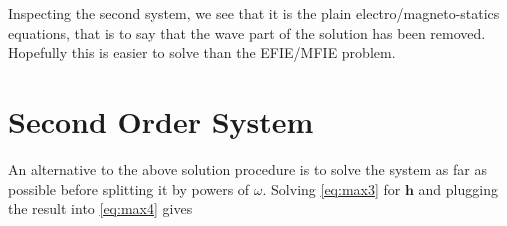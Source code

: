 \documentclass{article}
\theoremstyle{plain}
\begin{document}
Inspecting the second system, we see that it is the plain electro/magneto-statics equations, that is to say that the wave part of the solution has been removed. Hopefully this is easier to solve than the EFIE/MFIE problem.



\section{Second Order System}

An alternative to the above solution procedure is to solve the system as far as possible before splitting it by powers of $\omega$. Solving \eqref{eq:max3} for $\mathbf{h}$ and plugging the result into \eqref{eq:max4} gives
\end{document}
